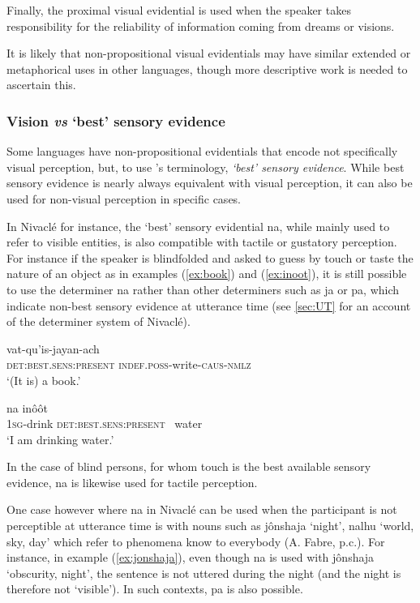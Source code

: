 \documentclass[oneside,a4paper,11pt]{article}
\newcommand{\ipa}[1]{{\phon \mbox{#1}}} %
\begin{document}
Finally, the proximal visual evidential is used when the speaker takes responsibility for the reliability of information coming from dreams or visions.

It is likely that non-propositional visual evidentials may have similar extended or metaphorical uses in other languages, though more descriptive work is needed to ascertain this.

\subsubsection{Vision \textit{vs} `best' sensory evidence}
Some languages have non-propositional evidentials that encode not specifically visual perception, but, to use \citet{gutierrez11evidentiality}'s terminology, \textit{`best' sensory evidence}. While best sensory evidence is nearly always equivalent with visual perception, it can also be used for non-visual perception in specific cases. 

In Nivaclé for instance, the `best' sensory evidential \ipa{na}, while mainly used to refer to visible entities, is also compatible with tactile or gustatory perception. For instance if the speaker is blindfolded and asked to guess by touch or taste the nature of an object as in examples (\ref{ex:book}) and (\ref{ex:inoot}), it is still possible to use the determiner \ipa{na} rather than other determiners such as \ipa{ja} or \ipa{pa}, which indicate non-best sensory evidence at utterance time (see \ref{sec:UT} for an account of the determiner system of Nivaclé).


\begin{exe}
\ex \label{ex:book}
\gll  \ipa{na}  \ipa{vat-qu'is-jayan-ach}  \\
\textsc{det:best.sens:present} \textsc{indef.poss}-write-\textsc{caus-nmlz} \\
\glt `(It is) a book.'
\end{exe}


\begin{exe}
\ex  \label{ex:inoot}
\gll  \ipa{c'a-yôji} \ipa{na}   \ipa{inôôt}    \\
\textsc{1sg}-drink \textsc{det:best.sens:present} \ water \\
\glt  `I am drinking water.'
\end{exe}

In the case of blind persons, for whom touch is the best available sensory evidence, \ipa{na} is likewise used for tactile perception. 

One case however where \ipa{na} in Nivaclé can be used when the participant is not perceptible at utterance time is with nouns such as \ipa{jônshaja}  `night', \ipa{nalhu}  `world, sky, day' which refer to phenomena know to everybody (A. Fabre, p.c.). For instance, in example (\ref{ex:jonshaja}), even though \ipa{na} is used with \ipa{jônshaja} `obscurity, night', the sentence is not uttered during the night (and the night is therefore not `visible'). In such contexts, \ipa{pa} is also possible.
\end{document}
